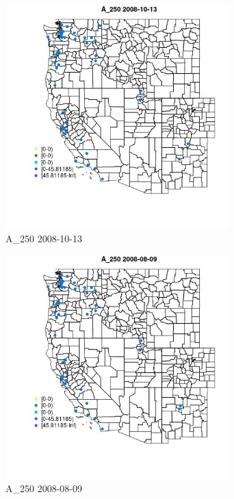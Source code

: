 \begin{figure} 
\centering  
\includegraphics[width=0.77\textwidth]{Code_Outputs/Report_ML_input_PM25_Step4_part_e_de_duplicated_aves_MapObsA_2502008-10-13.jpg} 
\caption{\label{fig:Report_ML_input_PM25_Step4_part_e_de_duplicated_avesMapObsA_2502008-10-13}A_250 2008-10-13} 
\end{figure} 
 

\clearpage 

\begin{figure} 
\centering  
\includegraphics[width=0.77\textwidth]{Code_Outputs/Report_ML_input_PM25_Step4_part_e_de_duplicated_aves_MapObsA_2502008-08-09.jpg} 
\caption{\label{fig:Report_ML_input_PM25_Step4_part_e_de_duplicated_avesMapObsA_2502008-08-09}A_250 2008-08-09} 
\end{figure} 
 


